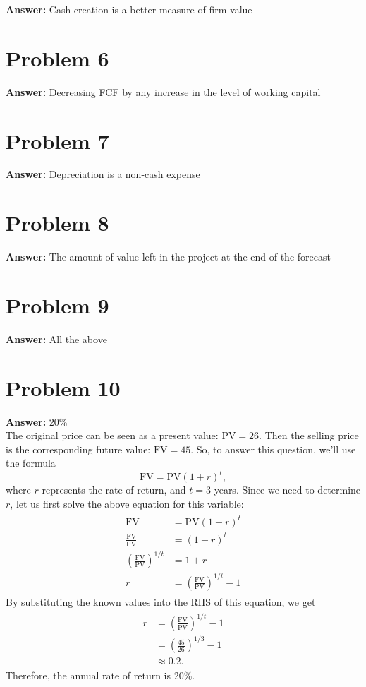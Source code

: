 \documentclass[11pt]{article}
\begin{document}
\textbf{Answer:} Cash creation is a better measure of firm value
\section*{Problem 6}
\label{sec:org90de6e5}

\textbf{Answer:} Decreasing FCF by any increase in the level of working capital
\section*{Problem 7}
\label{sec:org1dcab9b}

\textbf{Answer:} Depreciation is a non-cash expense
\section*{Problem 8}
\label{sec:orgd28051c}

\textbf{Answer:} The amount of value left in the project at the end of the forecast
\section*{Problem 9}
\label{sec:org28af67c}

\textbf{Answer:} All the above
\section*{Problem 10}
\label{sec:org0d4a56a}

\textbf{Answer:} 20\%\\

The original price can be seen as a present value: \(\mathrm{PV}=26\). Then
the selling price is the corresponding future value: \(\mathrm{FV}=45\). So,
to answer this question, we'll use the formula
\begin{equation}
\mathrm{FV}=\mathrm{PV}(1+r)^t,
\end{equation}
where \(r\) represents the rate of return, and \(t=3\) years. Since we need
to determine \(r\), let us first solve the above equation for this variable:
\begin{align}
  \begin{split}
    \mathrm{FV}&=\mathrm{PV}(1+r)^t\\
    \frac{\mathrm{FV}}{\mathrm{PV}}&=(1+r)^t\\
    \left(\frac{\mathrm{FV}}{\mathrm{PV}}\right)^{1/t}&=1+r\\
    r&=\left(\frac{\mathrm{FV}}{\mathrm{PV}}\right)^{1/t}-1
  \end{split}
\end{align}
By substituting the known values into the RHS of this equation, we get
\begin{align}
  \begin{split}
    r&=\left(\frac{\mathrm{FV}}{\mathrm{PV}}\right)^{1/t}-1\\
    &=\left(\frac{45}{26}\right)^{1/3}-1\\
    &\approx 0.2.
  \end{split}
\end{align}
Therefore, the annual rate of return is 20\%.
\end{document}
